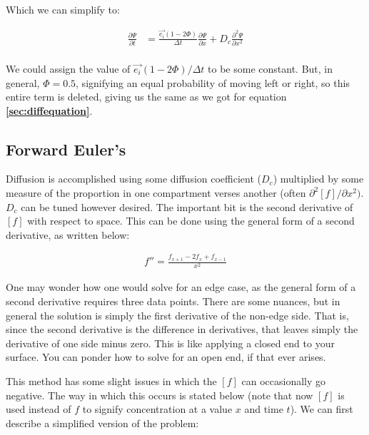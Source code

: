 Which we can simplify to: 

\begin{equation}
\begin{split}
    \frac{\partial \Psi}{\partial t} &= \frac{\Vec{e_i}(1-2\Phi)}{\Delta t}\frac{\partial \Psi}{\partial x} + D_c\frac{\partial^2 \Psi}{\partial x^2} \\
\end{split}
\end{equation}

We could assign the value of $\Vec{e_i}(1-2\Phi) /\Delta t$ to be some constant. But, in general, $\Phi = 0.5$, signifying an equal probability of moving left or right, so this entire term is deleted, giving us the same as we got for equation \textbf{\ref{sec:diffequation}}. 



\subsection{Forward Euler's} Diffusion is accomplished using some diffusion coefficient ($D_c$) multiplied by some measure of the proportion in one compartment verses another (often $\partial^2 [f]/\partial x^2)$. $D_c$ can be tuned however desired. The important bit is the second derivative of $[f]$ with respect to space. This can be done using the general form of a second derivative, as written below: 

\begin{equation} \label{diff1}
\begin{split}
f'' = \frac{f_{x + 1} - 2f_x + f_{x - 1}}{x^2}
\end{split}
\end{equation}

\bigskip

One may wonder how one would solve for an edge case, as the general form of a second derivative requires three data points. There are some nuances, but in general the solution is simply the first derivative of the non-edge side. That is, since the second derivative is the difference in derivatives, that leaves simply the derivative of one side minus zero. This is like applying a closed end to your surface. You can ponder how to solve for an open end, if that ever arises.\newline

This method has some slight issues in which the $[f]$ can occasionally go negative. The way in which this occurs is stated below (note that now $[f]$ is used instead of $f$ to signify concentration at a value $x$ and time $t$). We can first describe a simplified version of the problem:

